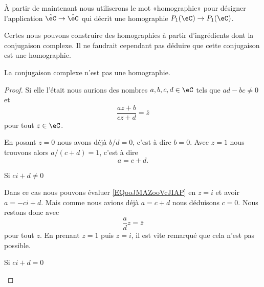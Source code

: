 \begin{normaltext}
    À partir de maintenant nous utiliserons le mot «homographie» pour désigner l'application \( \hat\eC\to\hat\eC\) qui décrit une homographie \( P_1(\eC)\to  P_1(\eC)\).
\end{normaltext}

Certes nous pouvons construire des homographies à partir d'ingrédients dont la conjugaison complexe. Il ne faudrait cependant pas déduire que cette conjugaison est une homographie.

\begin{lemma}       \label{LEMooGDDJooBpJlUf}
    La conjugaison complexe n'est pas une homographie.
\end{lemma}

\begin{proof}
    Si elle l'était nous aurions des nombres \( a,b,c,d\in \eC\) tels que \( ad-bc\neq 0\) et
    \begin{equation}        \label{EQooJMAZooVcJIAP}
        \frac{ az+b }{ cz+d }=\bar z
    \end{equation}
    pour tout \( z\in \eC\).

    En posant \( z=0\) nous avons déjà \( b/d=0\), c'est à dire \( b=0\). Avec \( z=1\) nous trouvons alors \( a/(c+d)=1\), c'est à dire
    \begin{equation}
        a=c+d.
    \end{equation}
    
    \begin{subproof}
        \item[Si \( ci+d\neq 0\)]

            Dans ce cas nous pouvons évaluer \eqref{EQooJMAZooVcJIAP} en \( z=i\) et avoir \( a=-ci+d\). Mais comme nous avions déjà \( a=c+d\) nous déduisons \( c=0\). Nous restons donc avec
            \begin{equation}
                \frac{ a }{ d }z=\bar z
            \end{equation}
            pour tout \( z\). En prenant \( z=1\) puis \( z=i\), il est vite remarqué que cela n'est pas possible.

        \item[Si \( ci+d =0\)]


\end{subproof}
\end{proof}
